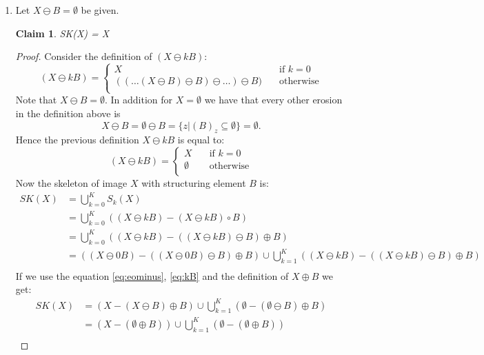 \documentclass[a4paper]{article}
\newtheorem*{claim}{Claim}
\begin{document}
\begin{enumerate}
\item 
Let $X \ominus B = \emptyset$ be given.
\begin{claim}
    SK(X) = X
\end{claim}
\begin{proof}
Consider the definition of $(X \ominus kB)$:
\[
    (X \ominus kB) =
         \begin{cases}
             X      & \quad \text{if } k = 0\\
             ((\dots(X \ominus B) \ominus B) \ominus \dots) \ominus B) & \quad \text{otherwise} \\
         \end{cases}
\]
Note that $X \ominus B = \emptyset$. In addition for $X = \emptyset$ we have that every other erosion in the definition above is
\begin{equation} \label{eq:eominus}
    X \ominus B = \emptyset \ominus B = \{z | (B)_{z} \subseteq \emptyset\} = \emptyset.
\end{equation}
Hence the previous definition $X \ominus kB$ is equal to:
\begin{equation} \label{eq:kB}
    (X \ominus kB) =
         \begin{cases}
             X      & \quad \text{if } k = 0\\
             \emptyset & \quad \text{otherwise} \\
         \end{cases}
\end{equation}
Now the skeleton of image $X$ with structuring element $B$ is:
\begin{align*}
    SK(X) &= \bigcup_{k = 0}^K S_{k}(X) \\
          &= \bigcup_{k = 0}^K \left((X\ominus kB) - (X \ominus kB) \circ B\right) \\
          &= \bigcup_{k = 0}^K \left((X \ominus kB) - ((X \ominus kB) \ominus B) \oplus B\right) \\
          &= \left((X \ominus 0B) - ((X \ominus 0B) \ominus B) \oplus B\right) \cup \bigcup_{k = 1}^K \left((X \ominus kB) - ((X \ominus kB) \ominus B) \oplus B\right) \\
\end{align*}
If we use the equation \ref{eq:eominus}, \ref{eq:kB} and the definition of $X \oplus B$ we get:
\begin{align*}
    SK(X) &= \left(X - (X \ominus B) \oplus B\right) \cup \bigcup_{k = 1}^K \left(\emptyset - (\emptyset \ominus B) \oplus B\right) \\
          &= \left(X - (\emptyset \oplus B)\right) \cup \bigcup_{k = 1}^K \left(\emptyset - (\emptyset \oplus B)\right) \\

\end{align*}
\end{proof}
\end{enumerate}
\end{document}
